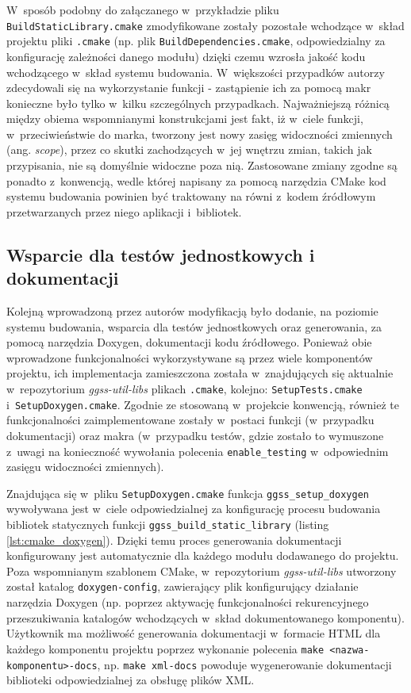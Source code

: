 W~sposób podobny do załączanego w~przykładzie pliku \lstinline{BuildStaticLibrary.cmake} zmodyfikowane zostały pozostałe wchodzące w~skład projektu pliki \lstinline{.cmake} (np. plik \lstinline{BuildDependencies.cmake}, odpowiedzialny za konfigurację zależności danego modułu) dzięki czemu wzrosła jakość kodu wchodzącego w~skład systemu budowania. W~większości przypadków autorzy zdecydowali się na wykorzystanie funkcji - zastąpienie ich za pomocą makr konieczne było tylko w~kilku szczególnych przypadkach. Najważniejszą różnicą między obiema wspomnianymi konstrukcjami jest fakt, iż w~ciele funkcji, w~przeciwieństwie do marka, tworzony jest nowy zasięg widoczności zmiennych (ang. \emph{scope}), przez co skutki zachodzących w~jej wnętrzu zmian, takich jak przypisania, nie są domyślnie widoczne poza nią. Zastosowane zmiany zgodne są ponadto z~konwencją, wedle której napisany za pomocą narzędzia CMake kod systemu budowania powinien być traktowany na równi z~kodem źródłowym przetwarzanych przez niego aplikacji i~bibliotek. 

\subsection{Wsparcie dla testów jednostkowych i dokumentacji}
Kolejną wprowadzoną przez autorów modyfikacją było dodanie, na poziomie systemu budowania, wsparcia dla testów jednostkowych oraz generowania, za pomocą narzędzia Doxygen, dokumentacji kodu źródłowego. Ponieważ obie wprowadzone funkcjonalności wykorzystywane są przez wiele komponentów projektu, ich implementacja zamieszczona została w~znajdujących się aktualnie w~repozytorium \emph{ggss-util-libs} plikach \lstinline{.cmake}, kolejno: \lstinline{SetupTests.cmake} i~\lstinline{SetupDoxygen.cmake}. Zgodnie ze stosowaną w~projekcie konwencją, również te funkcjonalności zaimplementowane zostały w~postaci funkcji (w~przypadku dokumentacji) oraz makra (w~przypadku testów, gdzie zostało to wymuszone z~uwagi na konieczność wywołania polecenia \lstinline{enable_testing} w~odpowiednim zasięgu widoczności zmiennych). 


Znajdująca się w~pliku \lstinline{SetupDoxygen.cmake} funkcja \lstinline{ggss_setup_doxygen} wywoływana jest w~ciele odpowiedzialnej za konfigurację procesu budowania bibliotek statycznych funkcji \lstinline{ggss_build_static_library} (listing \ref{lst:cmake_doxygen}). Dzięki temu proces generowania dokumentacji konfigurowany jest automatycznie dla każdego modułu dodawanego do projektu. Poza wspomnianym szablonem CMake, w~repozytorium \emph{ggss-util-libs} utworzony został katalog \lstinline{doxygen-config}, zawierający plik konfigurujący działanie narzędzia Doxygen (np. poprzez aktywację funkcjonalności rekurencyjnego przeszukiwania katalogów wchodzących w~skład dokumentowanego komponentu). Użytkownik ma możliwość generowania dokumentacji w~formacie HTML dla każdego komponentu projektu poprzez wykonanie polecenia \lstinline{make <nazwa-komponentu>-docs}, np. \lstinline{make xml-docs} powoduje wygenerowanie dokumentacji biblioteki odpowiedzialnej za obsługę plików XML.

